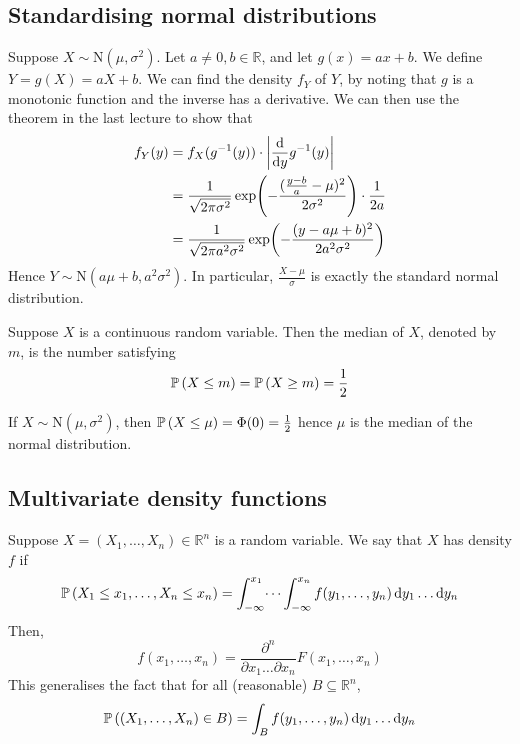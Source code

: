 \subsection{Standardising normal distributions}
Suppose \(X \sim \mathrm{N}(\mu, \sigma^2)\).
Let \(a \neq 0, b \in \mathbb R\), and let \(g(x) = ax+b\).
We define \(Y = g(X) = aX+b\).
We can find the density \(f_Y\) of \(Y\), by noting that \(g\) is a monotonic function and the inverse has a derivative.
We can then use the theorem in the last lecture to show that
\begin{align*}
	f_Y(y) & = f_X(g^{-1}(y)) \cdot \abs{\dv{y} g^{-1}(y)}                                                       \\
	       & = \frac{1}{\sqrt{2\pi\sigma^2}} \exp(-\frac{(\frac{y-b}{a} - \mu)^2}{2\sigma^2}) \cdot \frac{1}{2a} \\
	       & =\frac{1}{\sqrt{2\pi a^2\sigma^2}} \exp(-\frac{(y - a\mu + b)^2}{2 a^2 \sigma^2})
\end{align*}
Hence \(Y \sim \mathrm{N}(a \mu + b, a^2 \sigma^2)\).
In particular, \(\frac{X-\mu}{\sigma}\) is exactly the standard normal distribution.
\begin{definition}
	Suppose \(X\) is a continuous random variable.
	Then the median of \(X\), denoted by \(m\), is the number satisfying
	\[
		\mathbb{P}\left({X \leq m}\right) = \mathbb{P}\left({X \geq m}\right) = \frac{1}{2}
	\]
\end{definition}
\noindent If \(X \sim \mathrm{N}(\mu, \sigma^2)\), then \(\mathbb{P}\left({X \leq \mu}\right) = \Phi(0) = \frac{1}{2}\) hence \(\mu\) is the median of the normal distribution.

\subsection{Multivariate density functions}
Suppose \(X = (X_1, \dots, X_n) \in \mathbb R^n\) is a random variable.
We say that \(X\) has density \(f\) if
\[
	\mathbb{P}\left({X_1 \leq x_1, \dots, X_n \leq x_n}\right) = \int_{-\infty}^{x_1} \dots \int_{-\infty}^{x_n}  f(y_1, \dots, y_n) \dd{y_1} \dots \dd{y_n}
\]
Then,
\[
	f(x_1, \dots, x_n) = \frac{\partial^n}{\partial x_1 \dots \partial x_n} F(x_1, \dots, x_n)
\]
This generalises the fact that for all (reasonable) \(B \subseteq \mathbb R^n\),
\[
	\mathbb{P}\left({(X_1, \dots, X_n) \in B}\right) = \int_B f(y_1, \dots, y_n) \dd{y_1}\dots\dd{y_n}
\]

